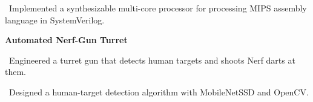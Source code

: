 \documentclass{article}
\begin{document}
\begin{minipage}[t]{3in\linewidth\hspace{0.95in}}
    \vspace{0.3em}
    \hspace{0em}\textasteriskcentered \, \mdseries\textrm{Implemented a synthesizable multi-core processor for processing MIPS assembly language in SystemVerilog.}

    \small\bfseries\textrm{Automated Nerf-Gun Turret}
    
    \vspace{0.3em}
    \hspace{0em}\textasteriskcentered \, \mdseries\textrm{Engineered a turret gun that detects human targets and shoots Nerf darts at them.}

    \vspace{0.5em}
    \hspace{0em}\textasteriskcentered \, \mdseries\textrm{Designed a human-target detection algorithm with MobileNetSSD and OpenCV.}

\end{minipage}
\end{document}
